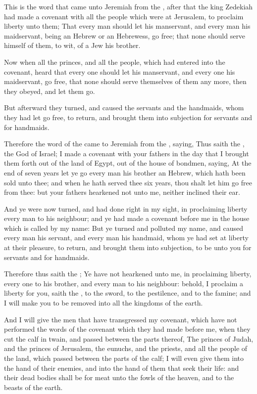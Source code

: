 \verse This is the word that came unto Jeremiah from the \LORD, after that the king Zedekiah had made a covenant with all the people which were at Jerusalem, to proclaim liberty unto them; \verse That every man should let his manservant, and every man his maidservant, being an Hebrew or an Hebrewess, go free; that none should serve himself of them, to wit, of a Jew his brother.

\verse Now when all the princes, and all the people, which had entered into the covenant, heard that every one should let his manservant, and every one his maidservant, go free, that none should serve themselves of them any more, then they obeyed, and let them go.

\verse But afterward they turned, and caused the servants and the handmaids, whom they had let go free, to return, and brought them into subjection for servants and for handmaids.

\verse Therefore the word of the \LORD came to Jeremiah from the \LORD, saying, \verse Thus saith the \LORD, the God of Israel; I made a covenant with your fathers in the day that I brought them forth out of the land of Egypt, out of the house of bondmen, saying, \verse At the end of seven years let ye go every man his brother an Hebrew, which hath been sold unto thee; and when he hath served thee six years, thou shalt let him go free from thee: but your fathers hearkened not unto me, neither inclined their ear.

\verse And ye were now turned, and had done right in my sight, in proclaiming liberty every man to his neighbour; and ye had made a covenant before me in the house which is called by my name: \verse But ye turned and polluted my name, and caused every man his servant, and every man his handmaid, whom ye had set at liberty at their pleasure, to return, and brought them into subjection, to be unto you for servants and for handmaids.

\verse Therefore thus saith the \LORD; Ye have not hearkened unto me, in proclaiming liberty, every one to his brother, and every man to his neighbour: behold, I proclaim a liberty for you, saith the \LORD, to the sword, to the pestilence, and to the famine; and I will make you to be removed into all the kingdoms of the earth.

\verse And I will give the men that have transgressed my covenant, which have not performed the words of the covenant which they had made before me, when they cut the calf in twain, and passed between the parts thereof, \verse The princes of Judah, and the princes of Jerusalem, the eunuchs, and the priests, and all the people of the land, which passed between the parts of the calf; \verse I will even give them into the hand of their enemies, and into the hand of them that seek their life: and their dead bodies shall be for meat unto the fowls of the heaven, and to the beasts of the earth.


